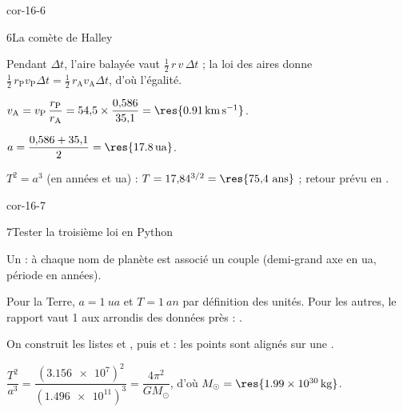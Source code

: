 \begin{blocLivre}{cor-16-6}
\begin{corrige}{6}{La comète de Halley}
\begin{questions}
\item Pendant $\Delta t$, l'aire balayée vaut $\frac12\,r\,v\,\Delta t$ ; la loi des aires donne
$\frac12\,r_\mathrm{P}v_\mathrm{P}\Delta t=\frac12\,r_\mathrm{A}v_\mathrm{A}\Delta t$, d'où l'égalité.
\item $v_\mathrm{A}=v_\mathrm{P}\,\dfrac{r_\mathrm{P}}{r_\mathrm{A}}=54{,}5\times\dfrac{0{,}586}{35{,}1}=\res{\qty{0,91}{km.s^{-1}}}$.
\item $a=\dfrac{0{,}586+35{,}1}{2}=\res{\qty{17,8}{ua}}$.
\item $T^2=a^3$ (en années et ua) : $T=17{,}84^{3/2}=\res{75{,}4~\text{ans}}$ ; retour prévu en .
\end{questions}
\end{corrige}
\end{blocLivre}
\begin{blocLivre}{cor-16-7}
\begin{corrige}{7}{Tester la troisième loi en Python}
\begin{questions}
\item Un  : à chaque nom de planète est associé un couple (demi-grand axe en ua, période en années).
\item Pour la Terre, $a=\qty{1}{ua}$ et $T=\qty{1}{an}$ par définition des unités. Pour les autres, le rapport vaut 1 aux arrondis
des données près : .
\item On construit les listes  et
, puis  et  : les points
sont alignés sur une .
\item $\dfrac{T^2}{a^3}=\dfrac{(\num{3.156e7})^2}{(\num{1.496e11})^3}=\dfrac{4\pi^2}{GM_\odot}$, d'où $M_\odot=\res{\qty{1,99e30}{kg}}$.
\end{questions}
\end{corrige}
\end{blocLivre}
